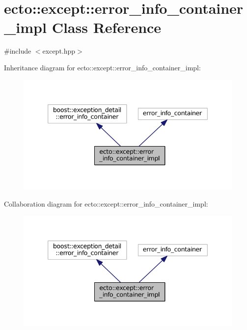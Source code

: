 \hypertarget{classecto_1_1except_1_1error__info__container__impl}{\section{ecto\-:\-:except\-:\-:error\-\_\-info\-\_\-container\-\_\-impl Class Reference}
\label{classecto_1_1except_1_1error__info__container__impl}
}


{\ttfamily \#include $<$except.\-hpp$>$}



Inheritance diagram for ecto\-:\-:except\-:\-:error\-\_\-info\-\_\-container\-\_\-impl\-:\nopagebreak
\begin{figure}[H]
\begin{center}
\leavevmode
\includegraphics[width=339pt]{classecto_1_1except_1_1error__info__container__impl__inherit__graph}
\end{center}
\end{figure}


Collaboration diagram for ecto\-:\-:except\-:\-:error\-\_\-info\-\_\-container\-\_\-impl\-:\nopagebreak
\begin{figure}[H]
\begin{center}
\leavevmode
\includegraphics[width=339pt]{classecto_1_1except_1_1error__info__container__impl__coll__graph}
\end{center}
\end{figure}
